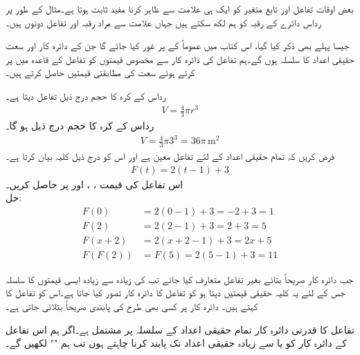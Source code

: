 بعض اوقات تفاعل اور تابع متغیر کو ایک ہی علامت سے ظاہر کرنا مفید ثابت ہوتا ہے۔مثال کے طور پر رداس  دائرے کے رقبہ کو ہم  لکھ سکتے ہیں جہاں علامت  سے مراد رقبہ اور تفاعل دونوں ہیں۔

جیسا پہلے بھی ذکر کیا گیا، اس کتاب میں عموماً  کے  پر غور کیا جائے گا جن کے دائرہ کار اور سعت حقیقی اعداد کا سلسلہ ہوں گے۔ہم تفاعل کی دائرہ کار سے مخصوص قیمتوں کو تفاعل کے قاعدہ میں پر کرتے ہوئے سعت کی مطابقتی قیمتیں حاصل کرتے ہیں۔

رداس  کے کرہ کا حجم  درج ذیل تفاعل دیتا ہے۔
\begin{align*}
V=\frac{4}{3}\pi r^3
\end{align*}
  رداس کے کرہ کا حجم درج ذیل ہو گا۔
\begin{align*}
V=\frac{4}{3}\pi 3^3=36\pi \, \si{\meter\squared}
\end{align*}
فرض کریں کہ تمام حقیقی اعداد  کے لئے  تفاعل معین ہے اور اس کو درج ذیل کلیہ بیان کرتا ہے۔
\begin{align*}
F(t)=2(t-1)+3
\end{align*}
اس تفاعل کی قیمت ، ،  اور  پر حاصل کریں۔\\
حل:\quad
\begin{align*}
F(0)&=2(0-1)+3=-2+3=1\\
F(2)&=2(2-1)+3=2+3=5\\
F(x+2)&=2(x+2-1)+3=2x+5\\
F(F(2))&=F(5)=2(5-1)+3=11
\end{align*} 

جب دائرہ کار صریحاً بتائے بغیر تفاعل   متعارف کیا جائے تب  کی زیادہ سے زیادہ ایسی قیمتوں کا سلسلہ جس کے لئے یہ کلیہ حقیقی قیمتیں دیتا ہو کو تفاعل کا دائرہ کار تصور کیا جاتا ہے۔اس کو تفاعل کا  کہتے ہیں۔ دائرہ کار پر کسی بھی طرح کی پابندی  صریحاً بتلائی جاتی ہے۔

تفاعل  کا قدرتی دائرہ کار تمام حقیقی اعداد کے سلسلہ پر مشتمل ہے۔اگر ہم اس تفاعل کے دائرہ کار  کو  یا  سے زیادہ  حقیقی اعداد تک پابند کرنا چاہتے ہوں تب  ہم "" لکھیں گے۔    

